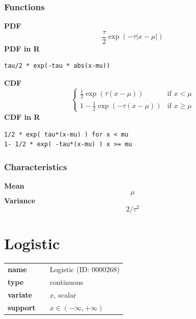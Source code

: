 \subsubsection*{Functions}

\smallskip \noindent \hspace{.2cm} \textbf{PDF} 
\begin{equation*}\frac{\tau}{2} \exp \left(-\tau|x-\mu| \right)\end{equation*}
\smallskip \noindent \hspace{.2cm} \textbf{PDF in R}  
\begin{verbatim}tau/2 * exp(-tau * abs(x-mu))\end{verbatim}
\smallskip \noindent \hspace{.2cm} \textbf{CDF} 
\begin{equation*}\begin{cases}
\frac12 \exp \left( \tau (x-\mu) \right) & \mbox{if }x < \mu \\
1-\frac12 \exp \left( -\tau (x-\mu) \right) & \mbox{if }x \geq \mu
\end{cases}\end{equation*}
\smallskip \noindent \hspace{.2cm} \textbf{CDF in R} 
\begin{verbatim}1/2 * exp( tau*(x-mu) ) for x < mu
1- 1/2 * exp( -tau*(x-mu) ) x >= mu\end{verbatim}
\smallskip
\subsubsection*{Characteristics}
\smallskip \noindent \hspace{.2cm} \textbf{Mean} 
\begin{equation*}\mu\end{equation*}
\smallskip \noindent \hspace{.2cm} \textbf{Variance} 
\begin{equation*}2 / \tau^2\end{equation*}
\smallskip
\section*{Logistic} 

  \bigskip 

\begin{tabular}{p{2cm}cl}
\textbf{name} & & Logistic (ID: 0000268)\\ 
 
\textbf{type} & & continuous \\ 

\textbf{variate} & & $x$, scalar \\ 

\textbf{support} & & $x \in (-\infty,+\infty)$
\end{tabular}

